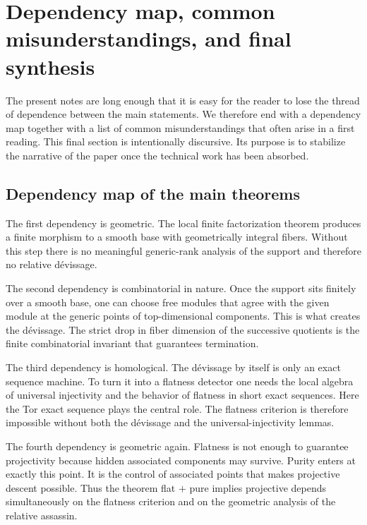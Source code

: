 \documentclass[11pt,oneside]{article}
\begin{document}
\section{Dependency map, common misunderstandings, and final synthesis}

The present notes are long enough that it is easy for the reader to lose the thread of dependence between the main statements.  We therefore end with a dependency map together with a list of common misunderstandings that often arise in a first reading.  This final section is intentionally discursive.  Its purpose is to stabilize the narrative of the paper once the technical work has been absorbed.

\subsection*{Dependency map of the main theorems}

The first dependency is geometric.  The local finite factorization theorem produces a finite morphism to a smooth base with geometrically integral fibers.  Without this step there is no meaningful generic-rank analysis of the support and therefore no relative d\'evissage.

The second dependency is combinatorial in nature.  Once the support sits finitely over a smooth base, one can choose free modules that agree with the given module at the generic points of top-dimensional components.  This is what creates the d\'evissage.  The strict drop in fiber dimension of the successive quotients is the finite combinatorial invariant that guarantees termination.

The third dependency is homological.  The d\'evissage by itself is only an exact sequence machine.  To turn it into a flatness detector one needs the local algebra of universal injectivity and the behavior of flatness in short exact sequences.  Here the Tor exact sequence plays the central role.  The flatness criterion is therefore impossible without both the d\'evissage and the universal-injectivity lemmas.

The fourth dependency is geometric again.  Flatness is not enough to guarantee projectivity because hidden associated components may survive.  Purity enters at exactly this point.  It is the control of associated points that makes projective descent possible.  Thus the theorem flat $+$ pure implies projective depends simultaneously on the flatness criterion and on the geometric analysis of the relative assassin.
\end{document}
